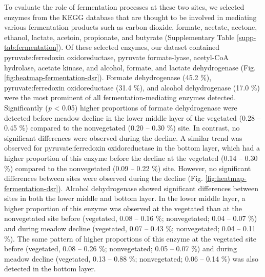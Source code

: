 \documentclass[
  12 pt,
]{article}
\begin{document}
To evaluate the role of fermentation processes at these two sites, we selected enzymes from the KEGG database that are thought to be involved in mediating various fermentation products such as carbon dioxide, formate, acetate, acetone, ethanol, lactate, acetoin, propionate, and butyrate (Supplementary Table \ref{supp-tab:fermentation}). Of these selected enzymes, our dataset contained pyruvate:ferredoxin oxidoreductase, pyruvate formate-lyase, acetyl-CoA hydrolase, acetate kinase, and alcohol, formate, and lactate dehydrogenase (Fig. \ref{fig:heatmap-fermentation-dsr}). Formate dehydrogenase (45.2 \si{\percent}), pyruvate:ferredoxin oxidoreductase (31.4 \si{\percent}), and alcohol dehydrogenase (17.0 \si{\percent}) were the most prominent of all fermentation-mediating enzymes detected. Significantly (\emph{p} \textless{} 0.05) higher proportions of formate dehydrogenase were detected before meadow decline in the lower middle layer of the vegetated (0.28 -- 0.45 \si{\percent}) compared to the nonvegetated (0.20 -- 0.30 \si{\percent}) site. In contrast, no significant differences were observed during the decline. A similar trend was observed for pyruvate:ferredoxin oxidoreductase in the bottom layer, which had a higher proportion of this enzyme before the decline at the vegetated (0.14 -- 0.30 \si{\percent}) compared to the nonvegetated (0.09 -- 0.22 \si{\percent}) site. However, no significant differences between sites were observed during the decline (Fig. \ref{fig:heatmap-fermentation-dsr}). Alcohol dehydrogenase showed significant differences between sites in both the lower middle and bottom layer. In the lower middle layer, a higher proportion of this enzyme was observed at the vegetated than at the nonvegetated site before (vegetated, 0.08 -- 0.16 \si{\percent}; nonvegetated; 0.04 -- 0.07 \si{\percent}) and during meadow decline (vegetated, 0.07 -- 0.43 \si{\percent}; nonvegetated; 0.04 -- 0.11 \si{\percent}). The same pattern of higher proportions of this enzyme at the vegetated site before (vegetated, 0.08 -- 0.26 \si{\percent}; nonvegetated; 0.05 -- 0.07 \si{\percent}) and during meadow decline (vegetated, 0.13 -- 0.88 \si{\percent}; nonvegetated; 0.06 -- 0.14 \si{\percent}) was also detected in the bottom layer.
\end{document}
